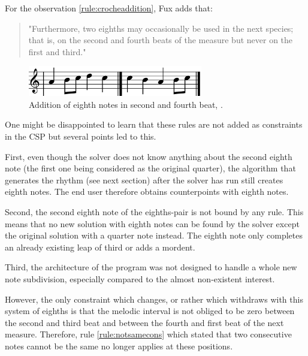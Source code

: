 For the observation \ref{rule:crocheaddition}, Fux adds that:
\begin{quotation}
    "Furthermore, two eighths may occasionally be used in the next species; that is, on the second and fourth beats of the measure but never on the first and third." \textcite[p.63]{GaPEng}
\end{quotation}

\begin{figure}[h]
    \centering
    \includegraphics[width=3in]{Images/quarter_variations.png}
    \caption{Addition of eighth notes in second and fourth beat, .}
    \label{fig:crocheaddition}
\end{figure}

One might be disappointed to learn that these rules are not added as constraints in the CSP but several points led to this.

First, even though the solver does not know anything about the second eighth note (the first one being considered as the original quarter), the algorithm that generates the rhythm (see next section) after the solver has run still creates eighth notes. The end user therefore obtains counterpoints with eighth notes.

Second, the second eighth note of the eighths-pair is not bound by any rule. This means that no new solution with eighth notes can be found by the solver except the original solution with a quarter note instead. The eighth note only completes an already existing leap of third or adds a mordent.

Third, the architecture of the program was not designed to handle a whole new note subdivision, especially compared to the almost non-existent interest.

However, the only constraint which changes, or rather which withdraws with this system of eighths is that the melodic interval is not obliged to be zero between the second and third beat and between the fourth and first beat of the next measure. Therefore, rule \ref{rule:notsamecons} which stated that two consecutive notes cannot be the same no longer applies at these positions.

